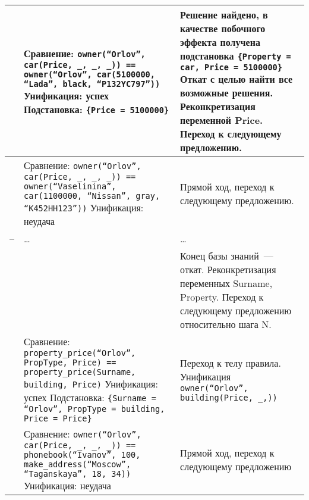 \begin{xltabular}{\textwidth}{|l|X|Y|}
		 &
		Сравнение:
		\texttt{owner(``Orlov'', car(Price, \_, \_, \_)) == owner(``Orlov'', car(5100000, ``Lada'', black, ``P132YC797''))} \newline\newline
		Унификация: успех \newline\newline
		Подстановка: \texttt{\{Price = 5100000\}} & 
		Решение найдено, в качестве побочного эффекта получена подстановка \texttt{\{Property = car, Price = 5100000\}} \newline\newline 
		Откат с целью найти все возможные решения.
		Реконкретизация переменной Price.
		Переход к следующему предложению.\\ \hline
		
		 &
		Сравнение:
		\texttt{owner(``Orlov'', car(Price, \_, \_, \_)) == owner(``Vaselinina'', car(1100000, ``Nissan'', gray, ``K452HH123''))} \newline\newline
		Унификация: неудача &
		Прямой ход, переход к следующему предложению. \\ \hline
		
		 --  & \dots & \dots \\ \hline
		 
		 &
		 &
		Конец базы знаний~--- откат.
		Реконкретизация переменных Surname, Property.
		Переход к следующему предложению относительно шага N.\\ \hline
		
		&
		Сравнение:
		\texttt{property\_price(``Orlov'', PropType, Price) == property\_price(Surname, building, Price)} \newline\newline
		Унификация: успех \newline\newline
		Подстановка: \texttt{\{Surname = ``Orlov'', PropType = building, Price = Price\}} & 
		Переход к телу правила. \newline\newline
		Унификация\newline
		\texttt{owner(``Orlov'', building(Price, \_,))} \\ \hline
		
		 &
		Сравнение:
		\texttt{owner(``Orlov'', car(Price, \_, \_, \_)) == phonebook(``Ivanov'', 100, make\_address(``Moscow'', ``Taganskaya'', 18, 34))} \newline\newline
		Унификация: неудача &
		Прямой ход, переход к следующему предложению \\ \hline
		

\end{xltabular}
